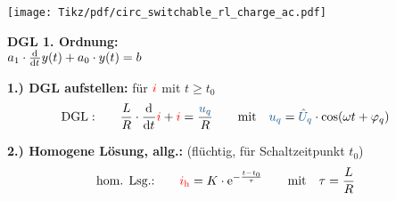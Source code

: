 {\begin{frame}[t]
    \begin{minipage}{\textwidth}\centering%
        \begin{minipage}[t][][t]{0.48\textwidth}\centering\vspace{0cm}%
            \texttt{[image: Tikz/pdf/circ\_switchable\_rl\_charge\_ac.pdf]}
        \end{minipage}%
        \begin{minipage}[t][][t]{0.48\textwidth}\centering\vspace{0cm}%
            \vspace{0.8cm}
            \textbf{DGL 1. Ordnung:}\\[0.85em]
            $a_1 \cdot \frac{\mathrm{d}^{{}}}{\mathrm{d}t^{{}}} y(t) + a_0 \cdot y(t)=b$\\
        \end{minipage}%
        \end{minipage}%
    \vspace{0.85cm}
    \textbf{1.) DGL aufstellen:} für ${\color{red}i}$ mit $t\geq t_0$
    \begin{align*}
        &\text{DGL}:&&&
            \frac{L}{R} \cdot \dt \eci{i}  + \eci{i}   &= \frac{\ecv{u_q}}{R}&&&
            &\text{mit}\quad \ecv{u_q} = \ecv{\hat{U}_q} \cdot \cos(\omega t + \varphi_q)
    \end{align*}%
    \pause%

    \textbf{2.) Homogene Lösung, allg.:} (flüchtig, für Schaltzeitpunkt $t_0$)
        \begin{align*}
            &\text{hom. Lsg.:} &&&
                {\color{red}i_{\mathrm{h}}}&= K \cdot \mathrm{e}^{-\frac{t-t_0}{\tau}} &&&
                &\text{mit}\quad \tau = \frac{L}{R}
        \end{align*}%

    \end{frame}

}
